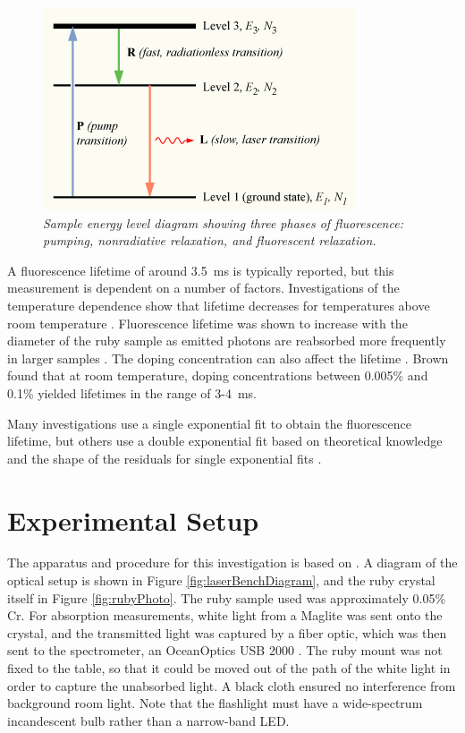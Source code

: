 \documentclass[11pt, a4paper, twocolumn]{article}
\begin{document}
\begin{figure}
\includegraphics[width=\linewidth]{Population-inversion-3level.png}
\caption{\textit{Sample energy level diagram showing three phases of fluorescence: pumping, nonradiative relaxation, and fluorescent relaxation.}}
\label{fig:Population-inversion-3level}
\end{figure}

A fluorescence lifetime of around \SI{3.5}{\ms} is typically reported, but this measurement is dependent on a number of factors. Investigations of the temperature dependence show that lifetime decreases for temperatures above room temperature \cite{Seat, Nelson}. Fluorescence lifetime was shown to increase with the diameter of the ruby sample as emitted photons are reabsorbed more frequently in larger samples \cite{Jones}. The doping concentration can also affect the lifetime \cite{Brown}. Brown found that at room temperature, doping concentrations between 0.005\% and 0.1\% yielded lifetimes in the range of 3-\SI{4}{\ms}.

Many investigations use a single exponential fit to obtain the fluorescence lifetime, but others use a double exponential fit based on theoretical knowledge and the shape of the residuals for single exponential fits \cite{McBane, Jones}. 

\section*{Experimental Setup}

The apparatus and procedure for this investigation is based on \cite{Heiman}. A diagram of the optical setup is shown in Figure \ref{fig:laserBenchDiagram}, and the ruby crystal itself in Figure \ref{fig:rubyPhoto}. The ruby sample used was approximately 0.05\% Cr. For absorption measurements, white light from a Maglite was sent onto the crystal, and the transmitted light was captured by a fiber optic, which was then sent to the spectrometer, an OceanOptics USB 2000 \cite{SpectrometerData}. The ruby mount was not fixed to the table, so that it could be moved out of the path of the white light in order to capture the unabsorbed light. A black cloth ensured no interference from background room light. Note that the flashlight must have a wide-spectrum incandescent bulb rather than a narrow-band LED.
\end{document}
